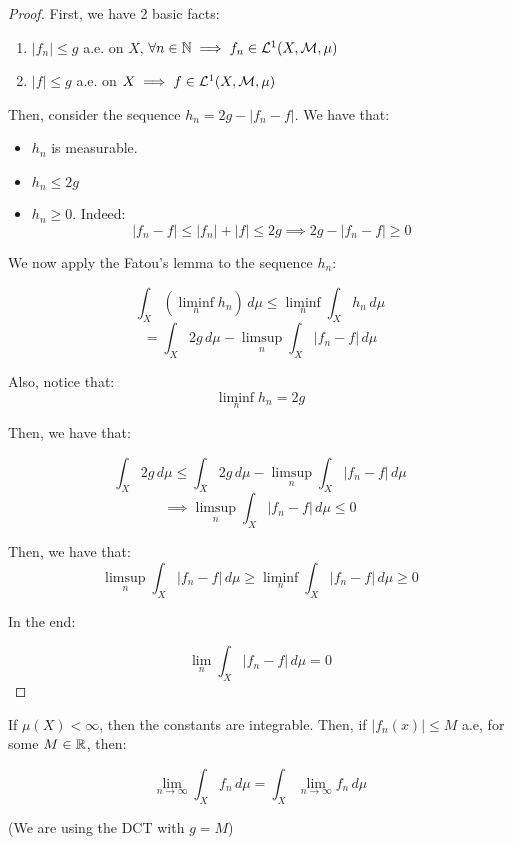 \begin{proof}
    First, we have 2 basic facts:

    \begin{enumerate}
        \item $|f_n| \leq g$ a.e. on $X$, $\forall n \in \mathbb{N} \implies f_n \in \mathcal{L}^1(X, \mathcal{M}, \mu)$
        
        \item $|f| \leq g$ a.e. on $X \implies f \in \mathcal{L}^1(X, \mathcal{M}, \mu)$
    \end{enumerate}

    Then, consider the sequence $h_n = 2g - |f_n - f|$. We have that:

    \begin{itemize}
        \item $h_n$ is measurable.
        \item $h_n \leq 2 g$
        \item $h_n \geq 0$. Indeed:
        $$|f_n - f| \leq |f_n| + |f| \leq 2g \implies 2g - |f_n - f| \geq 0$$
    \end{itemize}

    We now apply the Fatou's lemma to the sequence $h_n$:

    $$\int_{X} (\liminf_{n} h_n) \, d\mu \leq \liminf_{n} \int_{X} h_n \, d\mu$$
    $$ = \int_{X} 2g \, d\mu - \limsup_{n} \int_{X} |f_n - f| \, d\mu$$

    Also, notice that:
    $$\liminf_{n} h_n = 2g$$

    Then, we have that:

    $$\int_{X} 2g \, d\mu \leq \int_{X} 2g \, d\mu - \limsup_{n} \int_{X} |f_n - f| \, d\mu$$
    $$\implies \limsup_{n} \int_{X} |f_n - f| \, d\mu \leq 0$$

    Then, we have that:
    $$\limsup_{n} \int_{X} |f_n - f| \, d\mu \geq \liminf_{n} \int_{X} |f_n - f| \, d\mu \geq 0$$

    In the end:

    $$\lim_{n} \int_{X} |f_n - f| \, d\mu = 0$$
\end{proof}

\begin{fremark}
    If $\mu(X) < \infty$, then the constants are integrable. Then, if
    $|f_n(x)| \leq M$ a.e, for some $M \in \mathbb{R}$, then:

    $$\lim_{n \to \infty} \int_{X} f_n \, d\mu = \int_{X} \lim_{n \to \infty} f_n \, d\mu$$

    (We are using the DCT with $g = M$)
\end{fremark}

